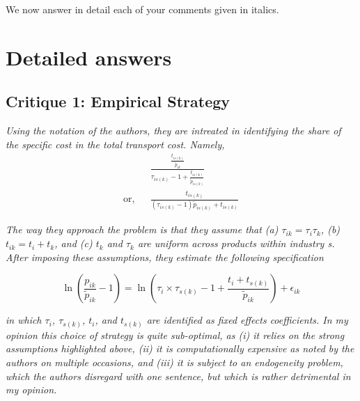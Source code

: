 \documentclass[a4paper,11pt]{article}
\begin{document}
We now answer in detail each of your comments given in italics.

\section{Detailed answers \label{sec:detailed_answers}}


\subsection{Critique 1: Empirical Strategy}

\textit{Using the notation of the authors, they are intreated
in identifying the share of the specific cost in the total transport cost. Namely,}
\begin{eqnarray*}
&& \frac{\frac{t_{is(k)}}{\tilde{p}_{ik}}}{\tau_{is(k)}-1 + \frac{t_{is(k)}}{\tilde{p}_{is(k)}}} \\
\text{or,} &&\frac{t_{is(k)}}{(\tau_{is(k)}-1)\tilde{p}_{is(k)} + t_{is(k)}}
\end{eqnarray*}

\textit{The way they approach the problem is that they assume that (a) $\tau_{ik} = \tau_i\tau_{k}$,
(b) $t_{ik} = t_i +t_k$, and (c) $t_k$ and $\tau_k$ are uniform across products within industry
s. After imposing these assumptions, they estimate the following specification}

\begin{equation}
\ln\left(\frac{p_{ik}}{\widetilde{p}_{ik}}-1 \right)= \ln \left(\tau_{i} \times \tau_{s(k)} -1+\frac{t_{i} + t_{s(k)}}{\widetilde{p}_{ik}} \right) + \epsilon_{ik} \label{eq:equation0}
\end{equation}

\textit{in which $\tau_i$, $\tau_{s(k)}$, $t_i$, and $t_{s(k)}$ are identified as fixed effects coefficients.
In my opinion this choice of strategy is quite sub-optimal, as (i) it relies on
the strong assumptions highlighted above, (ii) it is computationally expensive
as noted by the authors on multiple occasions, and (iii) it is subject to an
endogeneity problem, which the authors disregard with one sentence, but which
is rather detrimental in my opinion.}
\end{document}
